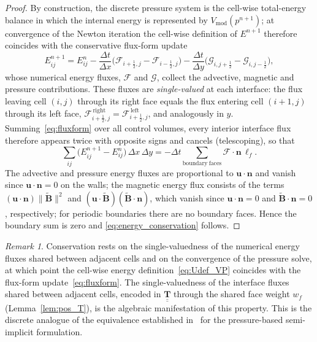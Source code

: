 \documentclass[a4paper,fleqn]{cas-sc}
\theoremstyle{definition}
\theoremstyle{remark}
\newtheorem{remark}{Remark}
\begin{document}
\begin{proof}
By construction, the discrete pressure system is the cell-wise total-energy balance in
which the internal energy is represented by $V_{\mathrm{mod}}(p^{n+1})$; at convergence of
the Newton iteration the cell-wise definition of $E^{n+1}$ therefore coincides with the
conservative flux-form update
\begin{equation}
\label{eq:fluxform}
E^{n+1}_{ij}=E^{n}_{ij}
-\frac{\Delta t}{\Delta x}\big(\mathcal{F}_{i+\frac12,j}-\mathcal{F}_{i-\frac12,j}\big)
-\frac{\Delta t}{\Delta y}\big(\mathcal{G}_{i,j+\frac12}-\mathcal{G}_{i,j-\frac12}\big),
\end{equation}
whose numerical energy fluxes, $\mathcal{F}$ and $\mathcal{G}$, collect the advective, magnetic
and pressure contributions. These fluxes are \emph{single-valued} at each interface: the
flux leaving cell $(i,j)$ through its right face equals the flux entering cell
$(i+1,j)$ through its left face,
$\mathcal{F}^{\,\mathrm{right}}_{i+\frac12,j}=\mathcal{F}^{\,\mathrm{left}}_{i+\frac12,j}$,
and analogously in $y$. Summing~\eqref{eq:fluxform} over all control volumes, every
interior interface flux therefore appears twice with opposite signs and cancels
(telescoping), so that
\begin{equation}
\sum_{ij}\big(E^{n+1}_{ij}-E^{n}_{ij}\big)\,\Delta x\,\Delta y
=-\Delta t\!\!\sum_{\mathrm{boundary\ faces}}\!\!\mathcal{F}\cdot\mathbf{n}\,\ell_f .
\end{equation}
The advective and pressure energy fluxes are proportional to
$\mathbf{u}\cdot\mathbf{n}$ and vanish since $\mathbf{u}\cdot\mathbf{n}=0$ on
the walls; the magnetic energy flux consists of the terms
$(\mathbf{u}\cdot\mathbf{n})\|\mathbf{\tilde{B}}\|^{2}$ and
$(\mathbf{u}\cdot\mathbf{\tilde{B}})(\mathbf{\tilde{B}}\cdot\mathbf{n})$, which vanish since
$\mathbf{u}\cdot\mathbf{n}=0$ and $\mathbf{\tilde{B}}\cdot\mathbf{n}=0$, respectively;
for periodic boundaries there are no boundary faces. Hence the boundary sum is
zero and \eqref{eq:energy_conservation} follows.
\end{proof}

\begin{remark}
Conservation rests on the single-valuedness of the numerical energy fluxes shared between
adjacent cells and on the convergence of the pressure solve, at which point the cell-wise
energy definition~\eqref{eq:Udef_VP} coincides with the flux-form
update~\eqref{eq:fluxform}. The single-valuedness of the interface fluxes shared between adjacent cells, encoded
in $\underline{\underline{\mathbf{T}}}$ through the shared face weight $w_f$
(Lemma~\ref{lem:pos_T}), is the algebraic manifestation of this property. This is the
discrete analogue of the equivalence established in~\cite{FVVEM} for the
pressure-based semi-implicit formulation.
\end{remark}
\end{document}
